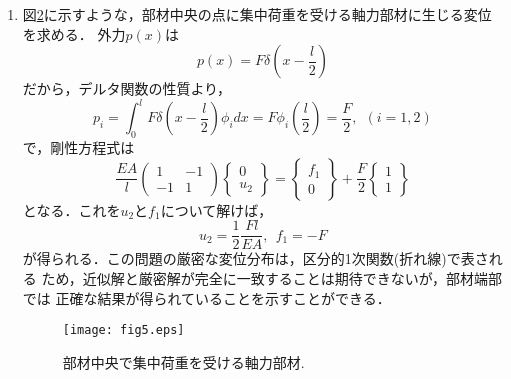 \documentclass[10pt,a4j]{jarticle}
\begin{document}
\begin{enumerate}
\begin{equation}
\begin{array}{c}
		1	
	\end{array}
	\right\}
\end{equation}
となり，
\begin{equation}
	u_2=\frac{p_0l^2}{2EA}, \ \ f_1=-p_0l
\end{equation}
が得られる．よって，変位の近似解は
\begin{equation}
	\tilde u(x)= \frac{p_0l^2}{2EA}\frac{x}{l}
\end{equation}
で，厳密解は$x$の2次関数だから，この問題では近似解と厳密解は一致し得ない．
しかしながら，部材端部では，近似解と厳密解が一致することを確かめることができる．
\begin{figure}[h]
	\begin{center}
	\texttt{[image: fig4.eps]} 
	\end{center}
	\caption{等分布荷重を受ける軸力部材.} 
	\label{fig:fig4}
\end{figure}
\item
図\ref{fig:fig5}に示すような，部材中央の点に集中荷重を受ける軸力部材に生じる変位を求める．
外力$p(x)$は
\begin{equation}
	p(x)=F\delta \left( x-\frac{l}{2}\right)
\end{equation}
だから，デルタ関数の性質より，
\begin{equation}
	p_i=\int_0^l F \delta\left(x-\frac{l}{2}\right)\phi_i dx =F\phi_i\left(\frac{l}{2}\right)= \frac{F}{2}
	, \ \ (i=1,2)
	\label{eqn:}
\end{equation}
で，剛性方程式は
\begin{equation}
	\frac{EA}{l}
	\left(
	\begin{array}{cc}
		1 & -1 \\
		-1 & 1
	\end{array}
	\right)
	\left\{
	\begin{array}{c}
		0 \\
		u_2
	\end{array}
	\right\}
	=
	\left\{
	\begin{array}{c}
		f_1 \\
		0	
	\end{array}
	\right\}
	+
	\frac{F}{2}
	\left\{
	\begin{array}{c}
		1 \\
		1	
	\end{array}
	\right\}
\end{equation}
となる．これを$u_2$と$f_1$について解けば，
\begin{equation}
	u_2=\frac{1}{2}\frac{Fl}{EA}, \ \ f_1=-F
	\label{eqn:}
\end{equation}
が得られる．この問題の厳密な変位分布は，区分的1次関数(折れ線)で表される
ため，近似解と厳密解が完全に一致することは期待できないが，部材端部では
正確な結果が得られていることを示すことができる．
\begin{figure}[h]
	\begin{center}
	\texttt{[image: fig5.eps]} 
	\end{center}
	\caption{部材中央で集中荷重を受ける軸力部材.} 
	\label{fig:fig5}
\end{figure}
\end{enumerate}
\end{document}
